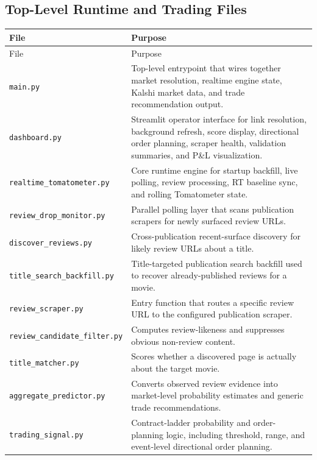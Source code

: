 \documentclass[11pt]{article}
\begin{document}
\subsection{Top-Level Runtime and Trading Files}
\begin{longtable}{>{\ttfamily}p{}p{}}
\toprule
File & Purpose \\
\midrule
\endfirsthead
\toprule
File & Purpose \\
\midrule
\endhead
\textnormal{\texttt{main.py}} & Top-level entrypoint that wires together market resolution, realtime engine state, Kalshi market data, and trade recommendation output. \\
\textnormal{\texttt{dashboard.py}} & Streamlit operator interface for link resolution, background refresh, score display, directional order planning, scraper health, validation summaries, and P\&L visualization. \\
\textnormal{\texttt{realtime\_tomatometer.py}} & Core runtime engine for startup backfill, live polling, review processing, RT baseline sync, and rolling Tomatometer state. \\
\textnormal{\texttt{review\_drop\_monitor.py}} & Parallel polling layer that scans publication scrapers for newly surfaced review URLs. \\
\textnormal{\texttt{discover\_reviews.py}} & Cross-publication recent-surface discovery for likely review URLs about a title. \\
\textnormal{\texttt{title\_search\_backfill.py}} & Title-targeted publication search backfill used to recover already-published reviews for a movie. \\
\textnormal{\texttt{review\_scraper.py}} & Entry function that routes a specific review URL to the configured publication scraper. \\
\textnormal{\texttt{review\_candidate\_filter.py}} & Computes review-likeness and suppresses obvious non-review content. \\
\textnormal{\texttt{title\_matcher.py}} & Scores whether a discovered page is actually about the target movie. \\
\textnormal{\texttt{aggregate\_predictor.py}} & Converts observed review evidence into market-level probability estimates and generic trade recommendations. \\
\textnormal{\texttt{trading\_signal.py}} & Contract-ladder probability and order-planning logic, including threshold, range, and event-level directional order planning. \\

\end{longtable}
\end{document}
